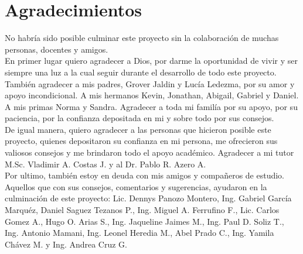 \chapter*{Agradecimientos}
\thispagestyle{empty}

No habr\'ia sido posible culminar este proyecto sin la colaboraci\'on de muchas personas, docentes y amigos.\\

En primer lugar quiero agradecer a Dios, por darme la oportunidad de vivir y ser siempre una luz a la cual seguir durante el desarrollo de todo este proyecto.\\

Tambi\'en agradecer a mis padres, Grover Jaldin y Luc\'ia Ledezma, por su amor y apoyo incondicional. A mis hermanos Kevin, Jonathan, Abigail, Gabriel y Daniel. A mis primas Norma y Sandra. Agradecer a toda mi famil\'ia por su apoyo, por su paciencia, por la confianza depositada en mi y sobre todo por sus consejos.\\

De igual manera, quiero agradecer a las personas que hicieron posible este proyecto, quienes depositaron su confianza en mi persona, me ofrecieron sus valiosos consejos y me brindaron todo el apoyo acad\'emico. Agradecer a mi tutor M.Sc. Vladimir A. Costas J. y al Dr. Pablo R. Azero A.\\

Por ultimo, tambi\'en estoy en deuda con mis amigos y compa\~neros de estudio. Aquellos que con sus consejos, comentarios y sugerencias, ayudaron en la culminaci\'on de este proyecto: Lic. Dennys Panozo Montero, Ing. Gabriel Garc\'ia Marqu\'ez, Daniel Saguez Tezanos P., Ing. Miguel A. Ferrufino F., Lic. Carlos Gomez A., Hugo O. Arias S., Ing. Jaqueline Jaimes M., Ing. Paul D. Soliz T., Ing. Antonio Mamani, Ing. Leonel Heredia M., Abel Prado C., Ing. Yamila Ch\'avez M. y Ing. Andrea Cruz G.\\

\clearpage

